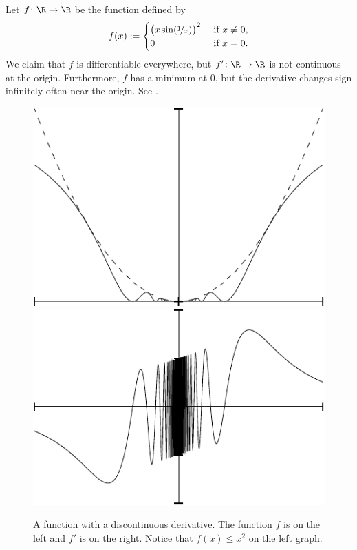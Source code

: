 \documentclass[12pt]{book}
\begin{document}
\begin{example} \label{baddifffunc:example}
Let $f \colon \R \to \R$ be the function defined by
\begin{equation*}
f(x) :=
\begin{cases}
{\bigl( x \sin(\nicefrac{1}{x}) \bigr)}^2 & \text{ if $x \not= 0$,} \\
0 & \text{ if $x = 0$.}
\end{cases}
\end{equation*}
We claim that $f$ is differentiable everywhere, but
$f' \colon \R \to \R$ is not continuous at
the origin.
Furthermore, $f$ has a minimum at 0, but the derivative
changes sign infinitely often near the origin.
See .
\begin{figure}[h!t]
\begin{center}
\includegraphics{nonc1difffig}
\qquad
\includegraphics{nonc1diffderfig}
\caption{A function with a discontinuous derivative. The function $f$ is on the left
and $f'$ is on the right.
Notice that $f(x) \leq x^2$ on the left graph.\label{fig:nonc1diff}}
\end{center}
\end{figure}


\end{example}
\end{document}
